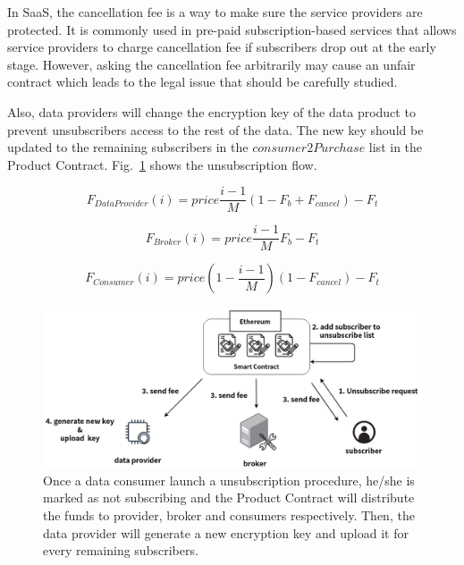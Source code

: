 \begin{spacing}{2.0}
In SaaS, the cancellation fee is a way to make sure the service providers are protected. It is commonly used in pre-paid subscription-based services that allows service providers to charge cancellation fee if subscribers drop out at the early stage. However, asking the cancellation fee arbitrarily may cause an unfair contract which leads to the legal issue that should be carefully studied.

Also, data providers will change the encryption key of the data product to prevent unsubscribers access to the rest of the data. The new key should be updated to the remaining subscribers in the $consumer2Purchase$ list in the Product Contract. Fig.~\ref{fig:unsubscribe} shows the unsubscription flow.

\begin{equation}
\label{equation:unsubscribe_provider}
    F_{DataProvider}(i) = price \frac{i-1}{M} (1-F_{b}+F_{cancel}) -F_{t}
\end{equation}

\begin{equation}
\label{equation:unsubscribe_broker}
    F_{Broker}(i) = price \frac{i-1}{M} F_{b} -F_{t}
\end{equation}

\begin{equation}
\label{equation:unsubscribe_consumer}
    F_{Consumer}(i) = price (1-\frac{i-1}{M})(1 -F_{cancel}) -F_{t}
\end{equation}

\begin{figure}[h]
    \centering
    \includegraphics[width=5.5in]{img/unsubscribe}
    \caption{Once a data consumer launch a unsubscription procedure, he/she is marked as not subscribing and the Product Contract will distribute the funds to provider, broker and consumers respectively. Then, the data provider will generate a new encryption key and upload it for every remaining subscribers.}
    \label{fig:unsubscribe}
\end{figure}
\clearpage


\end{spacing}
